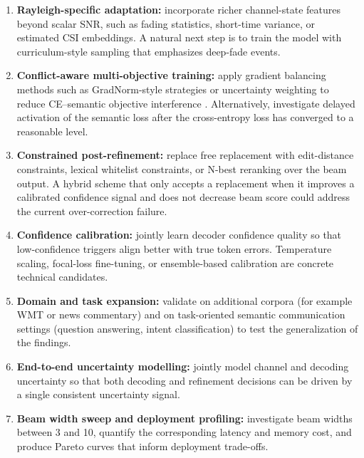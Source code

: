 \begin{enumerate}
    \item \textbf{Rayleigh-specific adaptation:} incorporate richer channel-state features beyond scalar SNR, such as fading statistics, short-time variance, or estimated CSI embeddings. A natural next step is to train the model with curriculum-style sampling that emphasizes deep-fade events.
    \item \textbf{Conflict-aware multi-objective training:} apply gradient balancing methods such as GradNorm-style strategies or uncertainty weighting to reduce CE--semantic objective interference \cite{kendall2018mtl, chen2018gradnorm}. Alternatively, investigate delayed activation of the semantic loss after the cross-entropy loss has converged to a reasonable level.
    \item \textbf{Constrained post-refinement:} replace free replacement with edit-distance constraints, lexical whitelist constraints, or N-best reranking over the beam output. A hybrid scheme that only accepts a replacement when it improves a calibrated confidence signal and does not decrease beam score could address the current over-correction failure.
    \item \textbf{Confidence calibration:} jointly learn decoder confidence quality so that low-confidence triggers align better with true token errors. Temperature scaling, focal-loss fine-tuning, or ensemble-based calibration are concrete technical candidates.
    \item \textbf{Domain and task expansion:} validate on additional corpora (for example WMT or news commentary) and on task-oriented semantic communication settings (question answering, intent classification) to test the generalization of the findings.
    \item \textbf{End-to-end uncertainty modelling:} jointly model channel and decoding uncertainty so that both decoding and refinement decisions can be driven by a single consistent uncertainty signal.
    \item \textbf{Beam width sweep and deployment profiling:} investigate beam widths between 3 and 10, quantify the corresponding latency and memory cost, and produce Pareto curves that inform deployment trade-offs.
\end{enumerate}

